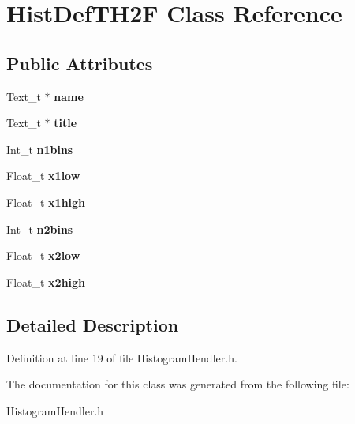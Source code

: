 \section{Hist\-Def\-T\-H2\-F Class Reference}
\label{classHistDefTH2F}
\subsection*{Public Attributes}
\begin{DoxyCompactItemize}
\item 
Text\-\_\-t $\ast$ {\bfseries name}\label{classHistDefTH2F_aa4907591af441fc74fd4650ae0ca1865}

\item 
Text\-\_\-t $\ast$ {\bfseries title}\label{classHistDefTH2F_a097897f263c113f0f0765765b5b57ed0}

\item 
Int\-\_\-t {\bfseries n1bins}\label{classHistDefTH2F_a5221dc24cef90b99c97343f2b49a4ee8}

\item 
Float\-\_\-t {\bfseries x1low}\label{classHistDefTH2F_a6a71a6551ce4e75240b7454a69900e90}

\item 
Float\-\_\-t {\bfseries x1high}\label{classHistDefTH2F_aac6670a8a22ce5c992ef29a6a8f407e0}

\item 
Int\-\_\-t {\bfseries n2bins}\label{classHistDefTH2F_a3e7fc427f419eebbeef423973ed4382e}

\item 
Float\-\_\-t {\bfseries x2low}\label{classHistDefTH2F_a699bbba7d3a4ebe6bf9e85a7244e44cb}

\item 
Float\-\_\-t {\bfseries x2high}\label{classHistDefTH2F_ae11cf64676043cd00405dab370375829}

\end{DoxyCompactItemize}


\subsection{Detailed Description}


Definition at line 19 of file Histogram\-Hendler.\-h.



The documentation for this class was generated from the following file\-:\begin{DoxyCompactItemize}
\item 
Histogram\-Hendler.\-h\end{DoxyCompactItemize}
